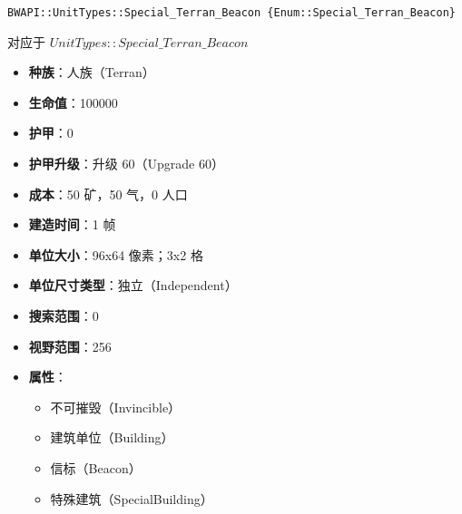 \begin{tcolorbox}[colback=white, colframe=black!60!white, title=Special\_Terran\_Beacon(), arc=0mm]
    \begin{verbatim}
BWAPI::UnitTypes::Special_Terran_Beacon {Enum::Special_Terran_Beacon}
    \end{verbatim}
    对应于  $UnitTypes::Special\_Terran\_Beacon$ 
    \begin{itemize}
        \item \textbf{种族}：人族（Terran）
        \item \textbf{生命值}：100000
        \item \textbf{护甲}：0
        \item \textbf{护甲升级}：升级 60（Upgrade 60）
        \item \textbf{成本}：50 矿，50 气，0 人口
        \item \textbf{建造时间}：1 帧
        \item \textbf{单位大小}：96x64 像素；3x2 格
        \item \textbf{单位尺寸类型}：独立（Independent）
        \item \textbf{搜索范围}：0
        \item \textbf{视野范围}：256
        \item \textbf{属性}：
            \begin{itemize}
                \item 不可摧毁（Invincible）
                \item 建筑单位（Building）
                \item 信标（Beacon）
                \item 特殊建筑（SpecialBuilding）
            \end{itemize}
    \end{itemize}
\end{tcolorbox}

